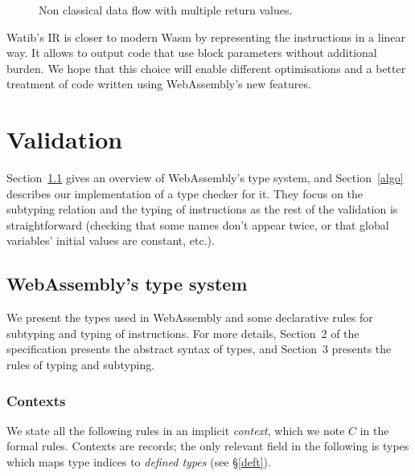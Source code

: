 \documentclass[a4paper,11pt]{article}
\begin{document}
\begin{figure}[h]
  \centering
  \caption{Non classical data flow with multiple return values.}\label{data-flow}
\end{figure}

\textsf{Watib}'s IR is closer to modern Wasm by representing the instructions in
a linear way. It allows to output code that use block parameters without
additional burden. We hope that this choice will enable different optimisations
and a better treatment of code written using WebAssembly's new features.

\section{Validation}\label{val}
Section~\ref{type} gives an overview of WebAssembly's type system, and
Section~\ref{algo} describes our implementation of a type checker for it. They
focus on the subtyping relation and the typing of instructions as the rest of
the validation is straightforward (checking that some names don't appear twice,
or that global variables' initial values are constant, etc.).
\subsection{WebAssembly's type system}\label{type}
We present the types used in WebAssembly and some declarative rules for
subtyping and typing of instructions. For more details, Section~2 of the
specification presents the abstract syntax of types, and Section~3 presents the
rules of typing and subtyping.
\subsubsection{Contexts}
We state all the following rules in an implicit \emph{context}, which we note
$C$ in the formal rules. Contexts are records; the only relevant field in the
following is \textsf{types} which maps type indices to \emph{defined types}
(see \S\ref{deft}).
\end{document}
